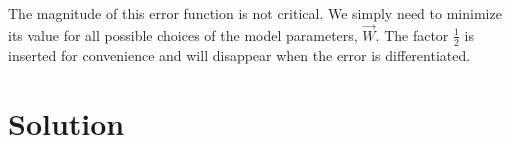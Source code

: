 \documentclass{article}
\begin{document}
The magnitude of this error function is not critical.
We simply need to minimize its value for all possible choices of the model parameters, \(\vec{W}\).
The factor \(\frac{1}{2}\) is inserted for convenience and will disappear when the error is differentiated.

\section{Solution}




\end{document}
